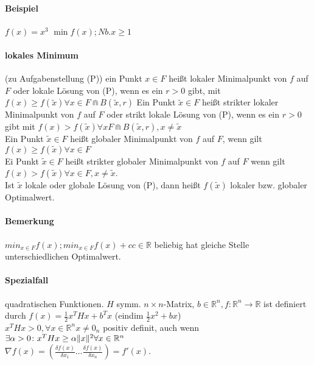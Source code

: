 \documentclass[ngerman,halfparskip]{scrartcl}
\DeclarePairedDelimiter{\norm}{\lVert}{\rVert}
\theoremstyle{definition}
\newcommand*{\R}{\mathbb{R}}      %
\begin{document}
\paragraph[1.1.3]{Beispiel}
$f(x)=x^3$ $\min f(x); Nb. x\geq 1$
\paragraph[Def 1.1.4]{lokales Minimum} (zu Aufgabenstellung (P)) ein Punkt $x\in F$ heißt lokaler Minimalpunkt von $f$ auf $F$ oder lokale Lösung von (P), wenn es ein $r>0$ gibt, mit $f(x)\geq f(\tilde x)\forall x\in F \Cap B(\tilde x,r)$ Ein Punkt $\tilde x\in F$ heißt strikter lokaler Minimalpunkt von $f$ auf $F$ oder strikt lokale Lösung von (P), wenn es ein $r>0$ gibt mit $f(x)>f(\tilde x)\forall x F\Cap B(\tilde x,r), x\neq \tilde x$ \\
Ein Punkt $\tilde{x} \in F$ heißt globaler Minimalpunkt von $f$ auf $F$, wenn gilt $f(x)\geq f(\tilde{x})\forall x\in F$\\
Ei Punkt $ \tilde x \in F$ heißt strikter globaler Minimalpunkt von $f$ auf $F$ wenn gilt $ f(x) >f(\tilde x) \forall x\in F, x\neq \tilde x$.\\
Ist $\tilde x$ lokale oder globale Lösung von (P), dann heißt $f(\tilde x)$ lokaler bzw. globaler Optimalwert.
\paragraph*{Bemerkung} $min_{x\in F} f(x); min_{x\in F} f(x)+c c\in\R$ beliebig hat gleiche Stelle unterschiedlichen Optimalwert.
\paragraph*{Spezialfall} quadratischen Funktionen. $H$ symm. $n\times n$-Matrix, $b\in\R^n, f\colon  \R^n\rightarrow \R$ ist definiert durch $f(x)=\frac 12 x^THx+b^Tx$ (eindim $\frac 12 x^2 +bx$)\\
$x^THx>0, \forall x\in \R^n x\neq 0_n$ positiv definit, auch wenn $\exists\alpha >0\colon  x^THx \geq \alpha \norm{x}^2\forall x\in\R^n$\\
$\nabla f(x)=(\frac{\delta f(x)}{\delta x_1} \ldots \frac{\delta f(x)}{\delta x_n})=f'(x)$.
\end{document}
